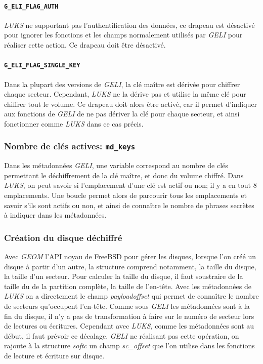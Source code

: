 \paragraph{\texttt{G\_ELI\_FLAG\_AUTH}}
\textit{LUKS} ne supportant pas l'authentification des données, ce drapeau est
désactivé pour ignorer les fonctions et les champs normalement utilisés par
\textit{GELI} pour réaliser cette action. Ce drapeau doit être désactivé.
\paragraph{\texttt{G\_ELI\_FLAG\_SINGLE\_KEY}}
Dans la plupart des versions de \textit{GELI}, la clé maître est dérivée pour
chiffrer chaque secteur. Cependant, \textit{LUKS} ne la dérive pas et utilise la
même clé pour chiffrer tout le volume. Ce drapeau doit alors être activé, car
il permet d'indiquer aux fonctions de \textit{GELI} de ne pas dériver la clé
pour chaque secteur, et ainsi fonctionner comme \textit{LUKS} dans ce cas
précis.

\subsubsection{Nombre de clés actives: \texttt{md\_keys}}
Dans les métadonnées \textit{GELI}, une variable correspond au nombre de clés
permettant le déchiffrement de la clé maître, et donc du volume chiffré. Dans
\textit{LUKS}, on peut savoir si l'emplacement d'une clé est actif ou non; il y
a en tout 8 emplacements. Une boucle permet alors de parcourir tous les
emplacements et savoir s'ils sont actifs ou non, et ainsi de connaître le nombre
de phrases secrètes à indiquer dans les métadonnées.

\subsubsection{Création du disque déchiffré}
Avec {\em GEOM} l'API noyau de FreeBSD pour gérer les disques, lorsque l'on
créé un disque à partir d'un autre, la structure comprend notamment, la taille
du disque, la taille d'un secteur. Pour calculer la taille du disque, il faut
soustraire de la taille du de la partition complète, la taille de l'en-tête. 
Avec les métadonnées de {\em LUKS} on a directement le champ {\em payloadoffset}
qui permet de connaître le nombre de secteurs qu'occupent l'en-tête. Comme sous
{\em GELI} les métadonnées sont à la fin du disque, il n'y a pas de
transformation à faire sur le numéro de secteur lors de lectures ou écritures.
Cependant avec {\em LUKS}, comme les métadonnées sont au début, il faut prévoir
ce décalage. {\em GELI} ne réalisant pas cette opération, on rajoute
à la structure {\em softc} un champ {\em sc\_offset} que l'on utilise dans les
fonctions de lecture et écriture sur disque.


